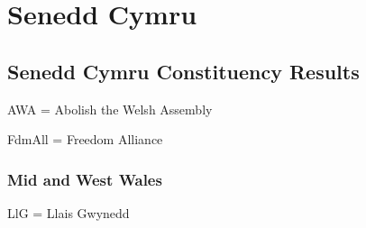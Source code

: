 \part{Senedd Cymru}

\chapter{Senedd Cymru Constituency Results}

AWA = Abolish the Welsh Assembly

FdmAll = Freedom Alliance

\section{Mid and West Wales}

%
LlG = Llais Gwynedd


